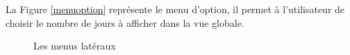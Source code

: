 La Figure \ref{menuoption} repr\'esente le menu d'option, il permet \`a l'utilisateur de choisir le nombre de jours \`a afficher dans la vue globale.
\begin{figure}[H]
\centering
	
		
	\caption{Les menus lat\'eraux}
	\label{home}
	
\end{figure}
